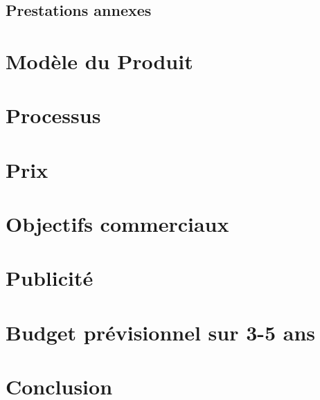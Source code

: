 \documentclass{article}
\begin{document}
\subsection{Prestations annexes}

\section{Modèle du Produit}

\section{Processus}

\section{Prix}

\section{Objectifs commerciaux}

\section{Publicité}

\section{Budget prévisionnel sur 3-5 ans}

\section{Conclusion}



\end{document}
